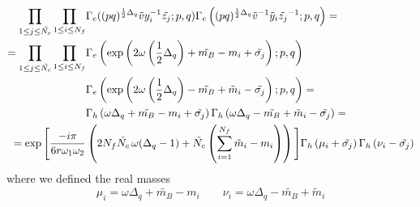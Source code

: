 \begin{appendices}
\begin{equation}
\begin{aligned}
 \prod_{ 1 \leq j \leq \tilde{N_c}} \prod_{ 1 \leq i \leq N_f} & \Gamma_e ( (pq)^{{1 \over 2 } \Delta_q} \tilde{v} y_i^{-1} \tilde{z_j} ; p,q)\Gamma_e \left( (pq)^{{1 \over 2 } \Delta_q} \tilde{v}^{-1} \tilde y_i \tilde{z_j}^{-1} ; p,q  \right)  = \\
 = \prod_{ 1 \leq j \leq \tilde{N_c}} \prod_{ 1 \leq i \leq N_f}  & \Gamma_e \left( \exp\left( 2 \omega \left( {1 \over 2 } \Delta_q \right)   + \tilde{m_B} - m_i  + \tilde{\sigma_j} \right) ; p,q \right) \\
 &\Gamma_e \left( \exp \left( 2 \omega \left(  {1 \over 2 } \Delta_q \right)  - \tilde{m_B} + \tilde  m_i  - \tilde{\sigma_j} \right) ; p,q \right)  = \\
&\Gamma_h \left(\omega \Delta_q + \tilde{m_B} - m_i  + \tilde{\sigma_j} \right) \Gamma_h \left(\omega \Delta_q - \tilde{m_B} +  \tilde m_i  - \tilde{\sigma_j} \right)  = \\
 =   
\exp \Bigg[  
 \frac{- i \pi}{6 r \omega_1 \omega_2} 
 &
 \left(
 2 N_f \tilde{N_c}\, \omega(\Delta_q-1) + \tilde{N_c} \left( 
 \sum_{i=1}^{N_f} \tilde{m}_i - m_i
 \right)
 \right)
\Bigg]
  \Gamma_h \left( \mu_i + \tilde{\sigma_j} \right) \Gamma_h \left(\nu_i - \tilde{\sigma_j} \right)
\end{aligned}
\end{equation}
where we defined the real masses
$$
 \mu_i = \omega \Delta_q + \tilde{m_B} - m_i   \qquad \nu_i  = \omega \Delta_q - \tilde{m_B} +  \tilde m_i
$$
\begin{comment}

\end{comment}
\end{appendices}
